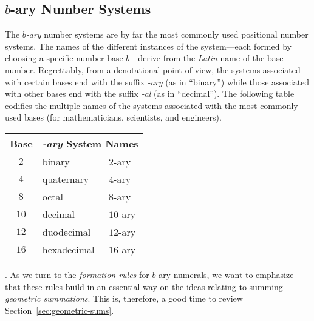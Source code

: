 \subsection{$b$-ary Number Systems}
\label{sec:b-ary-systems}

The {\it $b$-ary} number systems are by far the most commonly used
positional number systems.  The names of the different instances of
the system---each formed by choosing a specific number base
$b$---derive from the {\em Latin} name of the base number.
Regrettably, from a denotational point of view, the systems associated
with certain bases end with the suffix {\em -ary} (as in ``binary'')
while those associated with other bases end with the suffix {\em -al}
(as in ``decimal'').  The following table codifies the multiple names
of the systems associated with the most commonly used bases (for
mathematicians, scientists, and engineers).

\smallskip

\begin{tabular}{|c|l|l|}
\hline
{\bf Base} & \multicolumn{2}{c}{\bf {\em -ary} System Names}  \\
\hline
$2$   & binary     & $2$-ary  \\
\hline 
$4$   & quaternary & $4$-ary  \\
\hline
$8$   & octal      & $8$-ary \\
\hline
$10$  & decimal    & $10$-ary  \\
\hline
$12$  & duodecimal & $12$-ary  \\
\hline
$16$  & hexadecimal & $16$-ary \\
\hline
\end{tabular}

\bigskip

.
As we turn to the {\it formation rules} for $b$-ary numerals, we want
to emphasize that these rules build in an essential way on the ideas
relating to summing {\em geometric summations}.  This is, therefore, a
good time to review Section~\ref{sec:geometric-sums}.

\medskip


